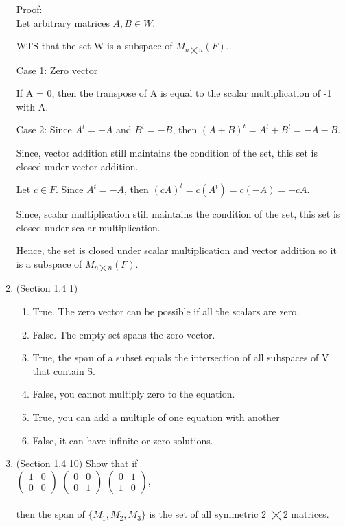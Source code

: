 \documentclass[12pt]{article}
\begin{document}
\begin{enumerate}
    Proof: \\
    Let arbitrary matrices $A, B \in W$. 
    
    WTS that the set W is a subspace of $M_{n \bigtimes n}(F).$. 

    Case 1: Zero vector

    If A = 0, then the transpose of A is equal to the scalar multiplication of -1 with A.

    Case 2: Since $A^t = -A$ and $B^t = -B$, then $(A + B)^t = A^t + B^t = -A - B$. 

    Since, vector addition still maintains the condition of the set, this set is closed under vector addition. 

    Let $c \in F$. Since $A^t = -A$, then $(cA)^t = c(A^t) = c(-A) = -cA$. 

    Since, scalar multiplication still maintains the condition of the set, this set is closed under scalar multiplication. 

    Hence, the set is closed under scalar multiplication and vector addition so it is a subspace of $M_{n \bigtimes n}(F)$. \qedsymbol{}
    

    \item (Section 1.4 1)
        \begin{enumerate}[label=(\alph*)]
            \item True. The zero vector can be possible if all the scalars are zero.
            \item False. The empty set spans the zero vector.
            \item True, the span of a subset equals the intersection of all subspaces of V that contain S.
            \item False, you cannot multiply zero to the equation. 
            \item True, you can add a multiple of one equation with another
            \item False, it can have infinite or zero solutions.
        \end{enumerate}
    
    \item  (Section 1.4 10)
    Show that if \\

    $\begin{pmatrix}
    1 & 0 \\
    0 & 0 
    \end{pmatrix}$ 
    $\begin{pmatrix}
    0 & 0 \\
    0 & 1 
    \end{pmatrix}$ 
    $\begin{pmatrix}
    0 & 1 \\
    1 & 0 
    \end{pmatrix}$, \\ \\
    then the span of $\{M_1, M_2, M_3\}$ is the set of all symmetric 2 $\bigtimes 2$ matrices.\\


\end{enumerate}
\end{document}
